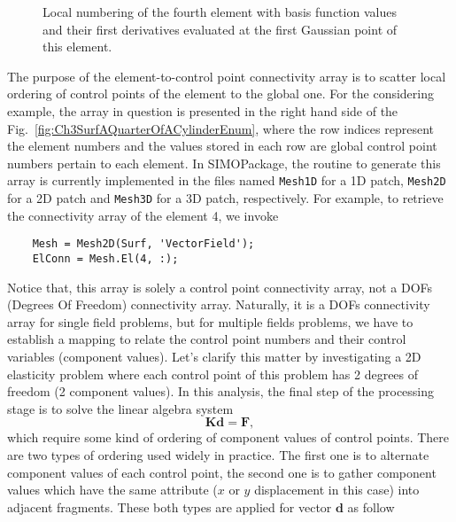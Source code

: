 \begin{figure}[H]
    \centering
    \normalsize
    
    \caption{Local numbering of the fourth element with basis function values and their first derivatives evaluated at the first Gaussian point of this element.}
    \label{fig:Ch3SurfAQuarterOfACylinderLocalEnum}
\end{figure}

The purpose of the element-to-control point connectivity array is to scatter local ordering of control points of the element to the global one. For the considering example, the array in question is presented in the right hand side of the Fig.~\ref{fig:Ch3SurfAQuarterOfACylinderEnum}, where the row indices represent the element numbers and the values stored in each row are global control point numbers pertain to each element. In SIMOPackage, the routine to generate this array is currently implemented in the files named \lstinline{Mesh1D} for a 1D patch, \lstinline{Mesh2D} for a 2D patch and \lstinline{Mesh3D} for a 3D patch, respectively. For example, to retrieve the connectivity array of the element 4, we invoke
\begin{lstlisting}
    Mesh = Mesh2D(Surf, 'VectorField');
    ElConn = Mesh.El(4, :);
\end{lstlisting}
Notice that, this array is solely a control point connectivity array, not a DOFs (Degrees Of Freedom) connectivity array. Naturally, it is a DOFs connectivity array for single field problems, but for multiple fields problems, we have to establish a mapping to relate the control point numbers and their control variables (component values). Let's clarify this matter by investigating a 2D elasticity problem where each control point of this problem has 2 degrees of freedom (2 component values). In this analysis, the final step of the processing stage is to solve the linear algebra system
\begin{equation}
    \mathbf{K} \mathbf{d} = \mathbf{F},
\end{equation}
which require some kind of ordering of component values of control points. There are two types of ordering used widely in practice. The first one is to alternate component values of each control point, the second one is to gather component values which have the same attribute ($x$ or $y$ displacement in this case) into adjacent fragments. These both types are applied for vector $\mathbf{d}$ as follow

